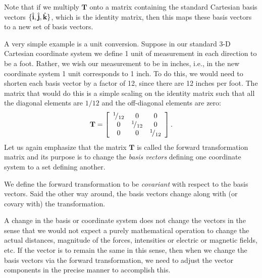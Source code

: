 Note that if we multiply $\mathbf{T}$ onto a matrix containing the standard Cartesian basis vectors $\{ \hat{\mathbf{i}}, \hat{\mathbf{j}}, \hat{\mathbf{k}} \}$, which is the identity matrix, then this maps these basis vectors to a new set of basis vectors.

A very simple example is a unit conversion. Suppose in our standard 3-D Cartesian coordinate system we define 1 unit of measurement in each direction to be a foot. Rather, we wish our measurement to be in inches, i.e., in the new coordinate system 1 unit corresponds to 1 inch. To do this, we would need to shorten each basis vector by a factor of 12, since there are 12 inches per foot. The matrix that would do this is a simple scaling on the identity matrix such that all the diagonal elements are $1/12$ and the off-diagonal elements are zero:
\begin{align}
  \mathbf{T} = 
  \left[ \begin{array}{c c c} {}^{1}\!/_{12} & 0 				& 0  \\
  						      0 			& {}^{1}\!/_{12} 	& 0  \\
  						      0 			& 0 				& {}^{1}\!/_{12}  \\ \end{array} \right] . \nonumber 
\end{align}
Let us again emphasize that the matrix $\mathbf{T}$ is called the forward transformation matrix and its purpose is to change the \emph{basis vectors} defining one coordinate system to a set defining another.

We define the forward transformation to be \emph{covariant} with respect to the basis vectors. Said the other way around, the basis vectors change along with (or covary with) the transformation.

A change in the basis or coordinate system does not change the vectors in the sense that we would not expect a purely mathematical operation to change the actual distances, magnitude of the forces, intensities or electric or magnetic fields, etc. If the vector is to remain the same in this sense, then when we change the basis vectors via the forward transformation, we need to adjust the vector components in the precise manner to accomplish this.

